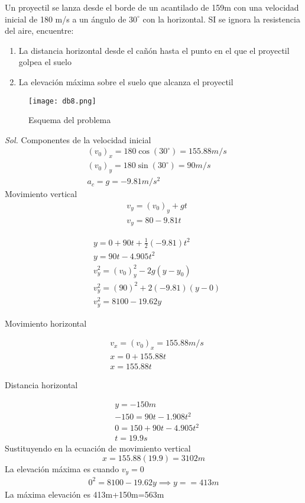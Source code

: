 \begin{example}
    Un proyectil se lanza desde el borde de un acantilado de 159m con una velocidad inicial de 180 m/s a un ángulo de $30^{\circ}$ con la horizontal. SI se ignora la resistencia del aire, encuentre: 
    \begin{enumerate}
        \item La distancia horizontal desde el cañón hasta el punto en el que el proyectil golpea el suelo
        \item La elevación máxima sobre el suelo que alcanza el proyectil
    \end{enumerate}
\end{example}
\begin{figure}[h!]
  \centerline{\texttt{[image: db8.png]}}
  \caption{Esquema del problema}
  \label{db8}
\end{figure}
\textit{ Sol. }
Componentes de la velocidad inicial
\begin{align*}
    &(v_0)_x=180\cos{(30^{\circ})}=155.88m/s\\
    &(v_0)_y=180\sin{(30^{\circ})}=90m/s\\
    &a_c=g=-9.81m/s^2
\end{align*}
Movimiento vertical
\begin{align*}
    &v_y=(v_0)_y+gt\\
    &v_y=80-9.81t
\end{align*}

\begin{align*}
    &y=0+90t+\frac{1}{2}(-9.81)t^2\\
    &y=90t-4.905t^2\\
    &v_y^2=(v_0)^2_y-2g(y-y_0)\\
    &v_y^2=(90)^2+2(-9.81)(y-0)\\
    &v_y^2=8100-19.62y
\end{align*}

Movimiento horizontal

\begin{align*}
    &v_x=(v_0)_x=155.88m/s\\
    &x=0+155.88t\\
    &x=155.88t
\end{align*}

Distancia horizontal

\begin{align*}
    &y=-150m\\
    &-150=90t-1.908t^2\\
    &0=150+90t-4.905t^2\\
    &t=19.9s
\end{align*}
Sustituyendo en la ecuación de movimiento vertical
\begin{equation*}
    x=155.88(19.9)=3102m
\end{equation*}
La elevación máxima es cuando $v_y=0$
\begin{align*}
    0^2=8100-19.62y\implies y==413m
\end{align*}
La máxima elevación es 413m+150m=563m

